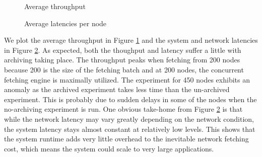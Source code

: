 \begin{figure}[th]
\begin{center}
\caption{Average throughput}
\label{fig:throughput}
\end{center}
\end{figure}

\begin{figure}[th]
\begin{center}
\caption{Average latencies per node}
\label{fig:latency}
\end{center}
\end{figure}

We plot the average throughput in Figure \ref{fig:throughput}
and the system and network latencies in Figure \ref{fig:latency}. 
As expected, both the thoughput and latency suffer a little with 
archiving taking place. The throughput peaks when fetching from
200 nodes because 200 is the size of the fetching batch and
at 200 nodes, the concurrent fetching engine is maximally utilized.
The experiment for 450 nodes exhibits an anomaly as the archived
experiment takes less time than the un-archived experiment.
This is probably due to sudden delays in some of the nodes when the
no-archiving experiment is run. One obvious take-home from
Figure \ref{fig:latency} is that while the network latency may
vary greatly depending on the network condition, the system latency
stays almost constant at relatively low levels. This shows that
the \padsd{} system runtime adds very little overhead to the 
inevitable network fetching cost, which means the system could scale to
very large applications. 

